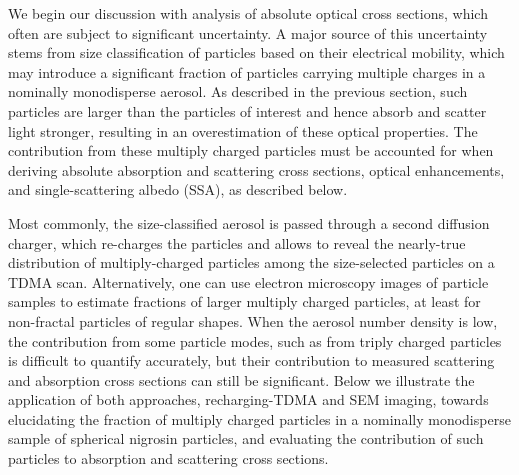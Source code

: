 We begin our discussion with analysis of absolute optical cross sections, which often are subject to significant uncertainty. A major source of this uncertainty stems from size classification of particles based on their electrical mobility, which may introduce a significant fraction of particles carrying multiple charges in a nominally monodisperse aerosol. As described in the previous section, such particles are larger than the particles of interest and hence absorb and scatter light stronger, resulting in an overestimation of these optical properties. The contribution from these multiply charged particles must be accounted for when deriving absolute absorption and scattering cross sections, optical enhancements, and single-scattering albedo (SSA), as described below.

Most commonly, the size-classified aerosol is passed through a second diffusion charger, which re-charges the particles and allows to reveal the nearly-true distribution of multiply-charged particles among the size-selected particles on a TDMA scan. Alternatively, one can use electron microscopy images of particle samples to estimate fractions of larger multiply charged particles, at least for non-fractal particles of regular shapes. When the aerosol number density is low, the contribution from some particle modes, such as from triply charged particles is difficult to quantify accurately, but their contribution to measured scattering and absorption cross sections can still be significant. Below we illustrate the application of both approaches, recharging-TDMA and SEM imaging, towards elucidating the fraction of multiply charged particles in a nominally monodisperse sample of spherical nigrosin particles, and evaluating the contribution of such particles to absorption and scattering cross sections.

